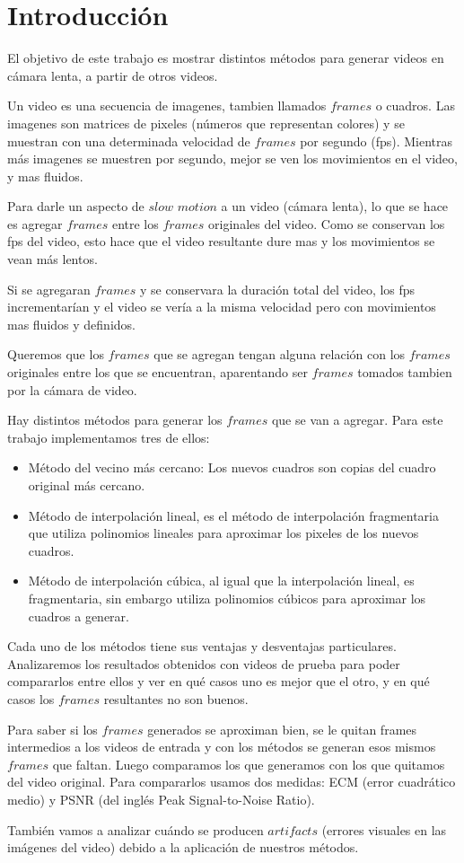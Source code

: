 \section{Introducción}

El objetivo de este trabajo es mostrar distintos métodos para generar videos en cámara lenta, a partir de otros videos.


Un video es una secuencia de imagenes, tambien llamados $frames$ o cuadros.  Las imagenes son matrices de pixeles (números que representan colores) y se muestran con una determinada velocidad de $frames$ por segundo (fps). Mientras más imagenes se muestren por segundo, mejor se ven los movimientos en el video, y mas fluidos.


Para darle un aspecto de $slow$ $motion$ a un video (cámara lenta), lo que se hace es agregar $frames$ entre los $frames$ originales del video. Como se conservan los fps del video, esto hace que el video resultante dure mas y los movimientos se vean más lentos. 

Si se agregaran $frames$ y se conservara la duración total del video, los fps incrementarían y el video se vería a la misma velocidad pero con movimientos mas fluidos y definidos.

 Queremos que los $frames$ que se agregan tengan alguna relación con los $frames$ originales entre los que se encuentran, aparentando ser $frames$ tomados tambien por la cámara de video.

Hay distintos métodos para generar los $frames$ que se van a agregar. Para este trabajo implementamos tres de ellos:

\begin{itemize}
\item Método del vecino más cercano: Los nuevos cuadros son copias del cuadro original más cercano.
\item Método de interpolación lineal, es el método de interpolación fragmentaria que utiliza polinomios lineales para aproximar los pixeles de los nuevos cuadros.
\item Método de interpolación cúbica, al igual que la interpolación lineal, es fragmentaria, sin embargo utiliza polinomios cúbicos para aproximar los cuadros a generar.
\end{itemize}

 Cada uno de los métodos tiene sus ventajas y desventajas particulares. Analizaremos los resultados obtenidos con videos de prueba para poder compararlos entre ellos y ver en qué casos uno es mejor que el otro, y en qué casos los $frames$ resultantes no son buenos.

 Para saber si los $frames$ generados se aproximan bien, se le quitan frames intermedios a los videos de entrada y con los métodos se generan esos mismos $frames$ que faltan. Luego comparamos los que generamos con los que quitamos del video original. Para compararlos usamos dos medidas: ECM (error cuadrático medio) y PSNR (del inglés Peak Signal-to-Noise Ratio).

 También vamos a analizar cuándo se producen $artifacts$ (errores visuales en las imágenes del video) debido a la aplicación de nuestros métodos. 
